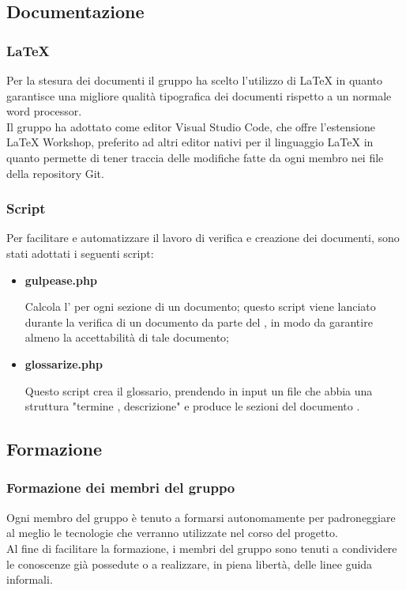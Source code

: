 \subsection{Documentazione}
\subsubsection{ \LaTeX{} }
Per la stesura dei documenti il gruppo ha scelto l'utilizzo di \LaTeX{} in quanto garantisce una migliore qualità tipografica dei documenti rispetto a un normale word processor.\\ 
Il gruppo ha adottato come editor Visual Studio Code, che offre l'estensione \LaTeX{} Workshop, preferito ad altri editor nativi per il linguaggio \LaTeX{} in quanto permette di tener traccia delle modifiche fatte da ogni membro nei file della repository Git.

\subsubsection{Script}
Per facilitare e automatizzare il lavoro di verifica e creazione dei documenti, sono stati adottati i seguenti script:
\begin{itemize}
    \item \textbf{gulpease.php}
    
    Calcola l' per ogni sezione di un documento; questo script viene lanciato durante la verifica di un documento da parte del \roleVerifier{}, in modo da garantire almeno la accettabilità di tale documento;
    \item \textbf{glossarize.php}
    
    Questo script crea il glossario, prendendo in input un file che abbia una struttura "termine , descrizione" e produce le sezioni del documento \docNameGlo{}.
\end{itemize}
\subsection{Formazione}
\subsubsection{Formazione dei membri del gruppo}
Ogni membro del gruppo è tenuto a formarsi autonomamente per padroneggiare al meglio le tecnologie che verranno utilizzate nel corso del progetto.\\
Al fine di facilitare la formazione, i membri del gruppo sono tenuti a condividere le conoscenze già possedute o a realizzare, in piena libertà, delle linee guida informali.

